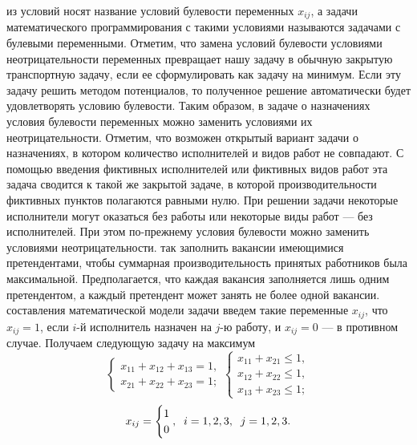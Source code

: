  из условий носят название условий булевости переменных $x_{ij}$, а задачи математического программирования с такими условиями называются задачами с булевыми переменными. Отметим, что замена условий булевости условиями неотрицательности переменных превращает нашу задачу в обычную закрытую транспортную задачу, если ее сформулировать как задачу на минимум. Если эту задачу решить методом потенциалов, то полученное решение автоматически будет удовлетворять условию булевости. Таким образом, в задаче о назначениях условия булевости переменных можно заменить условиями их неотрицательности. Отметим, что возможен открытый вариант задачи о назначениях, в котором количество исполнителей и видов работ не совпадают. С помощью введения фиктивных исполнителей или фиктивных видов работ эта задача сводится к такой же закрытой задаче, в которой производительности фиктивных пунктов полагаются равными нулю. При решении задачи некоторые исполнители могут оказаться без работы или некоторые виды работ — без исполнителей. При этом по-прежнему условия булевости можно заменить условиями неотрицательности.
 так заполнить вакансии имеющимися претендентами, чтобы суммарная производительность принятых работников была максимальной. Предполагается, что каждая вакансия заполняется лишь одним претендентом, а каждый претендент может занять не более одной вакансии.
 составления математической модели задачи введем такие переменные $x_{ij}$, что $x_{ij}=1$, если $i$-й исполнитель назначен на $j$-ю работу, и $x_{ij}=0$ — в противном случае. Получаем следующую задачу на максимум
$$
\begin{cases}
   x_{11} + x_{12} + x_{13} = 1,\\
   x_{21} + x_{22} + x_{23} = 1;
\end{cases}
\begin{cases}
	x_{11} + x_{21} \leq 1,\\
	x_{12} + x_{22} \leq 1,\\
	x_{13} + x_{23} \leq 1;
\end{cases}
$$
$$	x_{ij} = \begin{cases}
		1\\
		0
	\end{cases}\hspace{-1em},\;\; i = 1,2,3,\;\; j = 1,2,3.
$$
